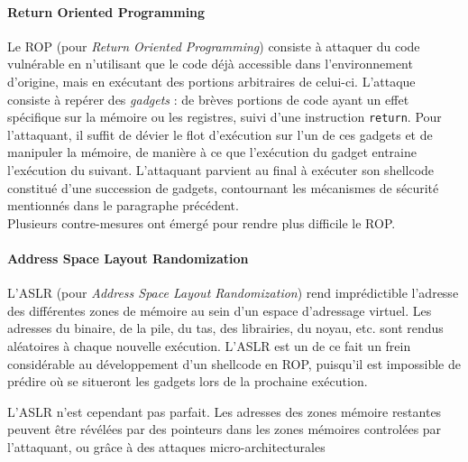 \paragraph{Return Oriented Programming}
\label{ROP}
Le ROP (pour \emph{Return Oriented Programming}) consiste à attaquer du code vulnérable en n'utilisant que le code déjà accessible dans l'environnement d'origine, mais en exécutant des portions arbitraires de celui-ci. L'attaque consiste à repérer des \emph{gadgets} : de brèves portions de code ayant un effet spécifique sur la mémoire ou les registres, suivi d'une instruction \texttt{return}. Pour l'attaquant, il suffit de dévier le flot d'exécution sur l'un de ces gadgets et de manipuler la mémoire, de manière à ce que l'exécution du gadget entraine l'exécution du suivant. L'attaquant parvient au final à exécuter son shellcode constitué d'une succession de gadgets, contournant les mécanismes de sécurité mentionnés dans le paragraphe précédent.\\

Plusieurs contre-mesures ont émergé pour rendre plus difficile le ROP.

\paragraph{Address Space Layout Randomization}
\label{aslr}
L'ASLR (pour \emph{Address Space Layout Randomization}) rend imprédictible l'adresse des différentes zones de mémoire au sein d'un espace d'adressage virtuel. Les adresses du binaire, de la pile, du tas, des librairies, du noyau, etc. sont rendus aléatoires à chaque nouvelle exécution. L'ASLR est un de ce fait un frein considérable au développement d'un shellcode en ROP, puisqu'il est impossible de prédire où se situeront les gadgets lors de la prochaine exécution.

L'ASLR n'est cependant pas parfait. Les adresses des zones mémoire restantes peuvent être révélées par des pointeurs dans les zones mémoires controlées par l'attaquant, %
ou grâce à des attaques micro-architecturales %

